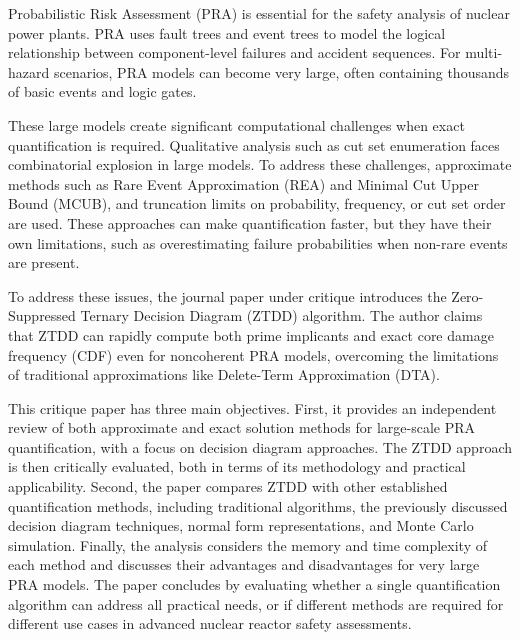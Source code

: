 Probabilistic Risk Assessment (PRA) is essential for the safety analysis of nuclear power plants. PRA uses fault trees and event trees to model the logical relationship between component-level failures and accident sequences. For multi-hazard scenarios, PRA models can become very large, often containing thousands of basic events and logic gates.

These large models create significant computational challenges when exact quantification is required. Qualitative analysis such as cut set enumeration faces combinatorial explosion in large models. To address these challenges, approximate methods such as Rare Event Approximation (REA) and Minimal Cut Upper Bound (MCUB), and truncation limits on probability, frequency, or cut set order are used. These approaches can make quantification faster, but they have their own limitations, such as overestimating failure probabilities when non-rare events are present.

To address these issues, the journal paper under critique introduces the Zero-Suppressed Ternary Decision Diagram (ZTDD) algorithm. The author claims that ZTDD can rapidly compute both prime implicants and exact core damage frequency (CDF) even for noncoherent PRA models, overcoming the limitations of traditional approximations like Delete-Term Approximation (DTA).

This critique paper has three main objectives. First, it provides an independent review of both approximate and exact solution methods for large-scale PRA quantification, with a focus on decision diagram approaches. The ZTDD approach is then critically evaluated, both in terms of its methodology and practical applicability. Second, the paper compares ZTDD with other established quantification methods, including traditional algorithms, the previously discussed decision diagram techniques, normal form representations, and Monte Carlo simulation. Finally, the analysis considers the memory and time complexity of each method and discusses their advantages and disadvantages for very large PRA models. The paper concludes by evaluating whether a single quantification algorithm can address all practical needs, or if different methods are required for different use cases in advanced nuclear reactor safety assessments.